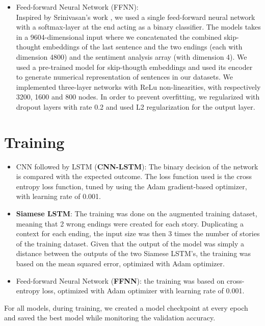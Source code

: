 \documentclass{article}
\begin{document}
\begin{itemize}
\item Feed-forward Neural Network (FFNN): \\
Inspired by Srinivasan's work \citep{ffnn}, we used a single feed-forward neural network with a softmax-layer at the end acting as a binary classifier. The models takes in a 9604-dimensional input where we concatenated the combined skip-thought embeddings of the last sentence and the two endings (each with dimension 4800) and the sentiment analysis array (with dimension 4). We used a pre-trained model\citep{ryankiros} for skip-thougth embeddings and used its encoder to generate numerical representation of sentences in our datasets. We implemented three-layer networks with ReLu non-linearities, with respectively 3200, 1600 and 800 nodes. In order to prevent overfitting, we regularized with dropout layers with rate 0.2 and used L2 regularization for the output layer.
\end{itemize}

\section{Training}

\begin{itemize}
\item CNN followed by LSTM (\textbf{CNN-LSTM}): The binary decision of the network is compared with the expected outcome. The loss function used is the cross entropy loss function, tuned by using the Adam gradient-based optimizer, with learning rate of 0.001.


\item \textbf{Siamese LSTM}: The training was done on the augmented training dataset, meaning that 2 wrong endings were created for each story. Duplicating a context for each ending, the input size was then 3 times the number of stories of the training dataset. Given that the output of the model was simply a distance between the outputs of the two Siamese LSTM's, the training was based on the mean squared error, optimized with Adam optimizer.

\item Feed-forward Neural Network (\textbf{FFNN}): the training was based on cross-entropy loss, optimized with Adam optimizer with learning rate of 0.001.

\end{itemize}

For all models, during training, we created a model checkpoint at every epoch and saved the best model while monitoring the validation accuracy.
\end{document}
